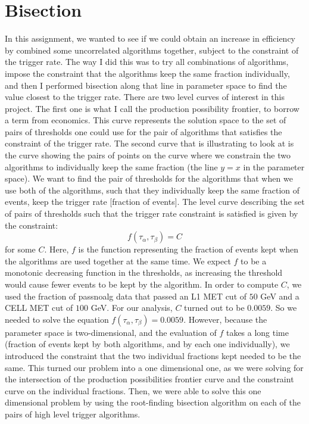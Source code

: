 \section{Bisection}
In this assignment, we wanted to see if we could obtain an increase in efficiency by combined some uncorrelated algorithms together, subject to the constraint of the trigger rate. 
The way I did this was to try all combinations of algorithms, impose the constraint that the algorithms keep the same fraction individually, and then I performed bisection along that line in parameter space to find the value closest to the trigger rate. 
There are two level curves of interest in this project. 
The first one is what I call the production possibility frontier, to borrow a term from economics. 
This curve represents the solution space to the set of pairs of thresholds one could use for the pair of algorithms that satisfies the constraint of the trigger rate.
The second curve that is illustrating to look at is the curve showing the pairs of points on the curve where we constrain the two algorithms to individually keep the same fraction (the line $y=x$ in the parameter space). 
We want to find the pair of thresholds for the algorithms that when we use both of the algorithms, such that they individually keep the same fraction of events, keep the trigger rate [fraction of events]. 
The level curve describing the set of pairs of thresholds such that the trigger rate constraint is satisfied is given by the constraint:
$$f(\tau_{\alpha},\tau_{\beta})=C$$
for some $C$. Here, $f$ is the function representing the fraction of events kept when the algorithms are used together at the same time. 
We expect $f$ to be a monotonic decreasing function in the thresholds, as increasing the threshold would cause fewer events to be kept by the algorithm.
In order to compute $C$, we used the fraction of passnoalg data that passed an L1 MET cut of $50$ GeV and a CELL MET cut of $100$ GeV. 
For our analysis, $C$ turned out to be $0.0059$.
So we needed to solve the equation $f(\tau_{\alpha},\tau_{\beta})=0.0059$. 
However, because the parameter space is two-dimensional, and the evaluation of $f$ takes a long time (fraction of events kept by both algorithms, and by each one individually), we introduced the constraint that the two individual fractions kept needed to be the same.
This turned our problem into a one dimensional one, as we were solving for the intersection of the production possibilities frontier curve and the constraint curve on the individual fractions. 
Then, we were able to solve this one dimensional problem by using the root-finding bisection algorithm on each of the pairs of high level trigger algorithms.  
